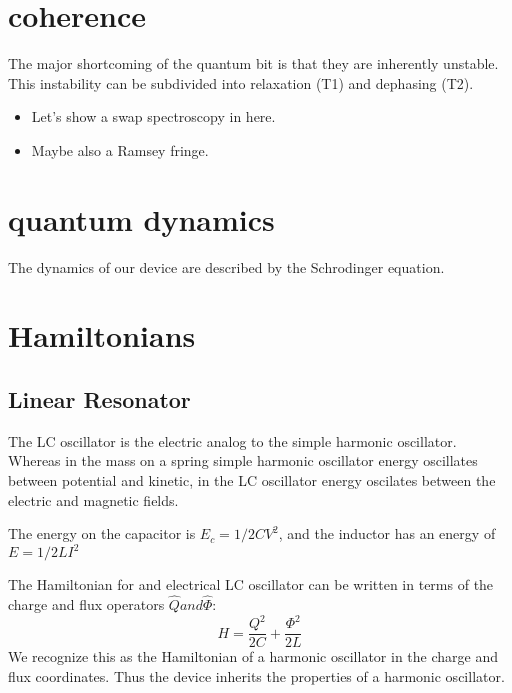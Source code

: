 \section{coherence}
The major shortcoming of the quantum bit is that they are inherently unstable.
This instability can be subdivided into relaxation (T1) and dephasing (T2).
\begin{itemize}
    \item Let's show a swap spectroscopy in here.
    \item Maybe also a Ramsey fringe.
\end{itemize}

\section{quantum dynamics}
The dynamics of our device are described by the Schrodinger equation.

\section{Hamiltonians}
\subsection{Linear Resonator}

The LC oscillator is the electric analog to the simple harmonic oscillator.
Whereas in the mass on a spring simple harmonic oscillator energy oscillates between potential and kinetic, in the LC oscillator energy oscilates between the electric and magnetic fields.

The energy on the capacitor is $E_c = 1/2 C V^2$, and the inductor has an energy of $E = 1/2 L I^2$

The Hamiltonian for and electrical LC oscillator can be written in terms of the charge and flux operators $\hat{Q} and \hat{\Phi}$:
\begin{equation}
    H = \frac{Q^2}{2C} + \frac{\Phi^2}{2L}
\end{equation}
We recognize this as the Hamiltonian of a harmonic oscillator in the charge and flux coordinates.
Thus the device inherits the properties of a harmonic oscillator.


